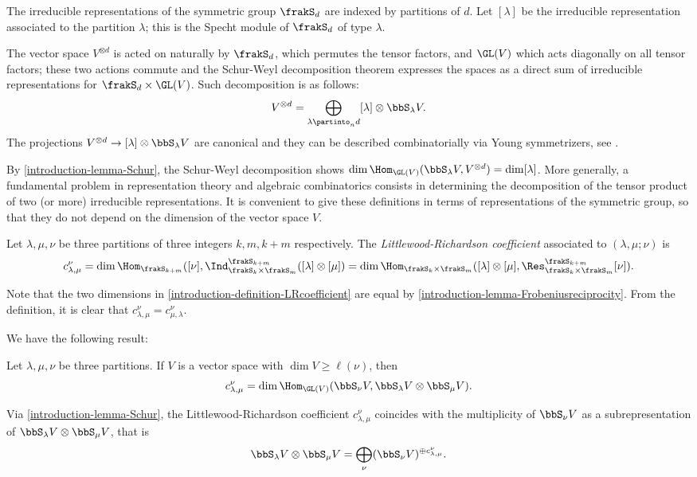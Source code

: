 The irreducible representations of the symmetric group $\frakS_d$ are indexed by partitions of $d$. Let $[\lambda]$ be the irreducible representation associated to the partition $\lambda$; this is the Specht module of $\frakS_d$ of type $\lambda$. 

The vector space $V^{\otimes d}$ is acted on naturally by $\frakS_d$, which permutes the tensor factors, and $\GL(V)$ which acts diagonally on all tensor factors; these two actions commute and the Schur-Weyl decomposition theorem expresses the spaces as a direct sum of irreducible representations for $\frakS_d \times \GL(V)$. Such decomposition is as follows:
\[
V^{\otimes d} = \bigoplus_{\lambda \partinto_n d} [\lambda] \otimes \bbS_{\lambda} V.
\]
The projections $V^{\otimes d} \to [\lambda] \otimes \bbS_\lambda V$ are canonical and they can be described combinatorially via Young symmetrizers, see \cite[Lecture 4]{FH91}.

By \ref{introduction-lemma-Schur}, the Schur-Weyl decomposition shows $\dim \Hom_{\GL(V)} ( \bbS_\lambda V, V^{\otimes d}) = \dim [\lambda]$. More generally, a fundamental problem in representation theory and algebraic combinatorics consists in determining the decomposition of the tensor product of two (or more) irreducible representations. It is convenient to give these definitions in terms of representations of the symmetric group, so that they do not depend on the dimension of the vector space $V$.

\begin{definition}
 \label{introduction-definition-LRcoefficient}
 Let $\lambda,\mu,\nu$ be three partitions of three integers $k,m, k+m$ respectively. The {\it Littlewood-Richardson coefficient} associated to $(\lambda,\mu;\nu)$ is 
 \[
c^\nu_{\lambda,\mu} = 
\dim \Hom_{\frakS_{k+m}} ([\nu], \Ind_{\frakS_k \times \frakS_m}^{\frakS_{k+m}} ([\lambda] \otimes [\mu]) = 
\dim \Hom_{\frakS_{k} \times \frakS_m} ([\lambda] \otimes [\mu] , \Res_{\frakS_k \times \frakS_m}^{\frakS_{k+m}} [\nu]).
\]
\end{definition}
Note that the two dimensions in \ref{introduction-definition-LRcoefficient} are equal by \ref{introduction-lemma-Frobeniusreciprocity}. From the definition, it is clear that $c^\nu_{\lambda,\mu} = c^\nu_{\mu,\lambda}$. 

We have the following result:
\begin{lemma}
 \label{introduction-lemma-LRcoefficientGL}
  Let $\lambda,\mu,\nu$ be three partitions. If $V$ is a vector space with $\dim V \geq \ell(\nu)$, then 
 \[
c^\nu_{\lambda,\mu} = \dim \Hom_{\GL(V)} (\bbS_\nu V,  \bbS_\lambda V \otimes \bbS_\mu V ).
\]
\end{lemma}
Via \ref{introduction-lemma-Schur}, the Littlewood-Richardson coefficient $c^\nu_{\lambda,\mu} $ coincides with the multiplicity of $\bbS_\nu V$ as a subrepresentation of $ \bbS_\lambda V \otimes \bbS_\mu V $, that is 
\[
 \bbS_\lambda V \otimes \bbS_\mu V  = \bigoplus_{\nu } (\bbS_{\nu} V )^{\oplus c^\nu_{\lambda,\mu} }.
\]

